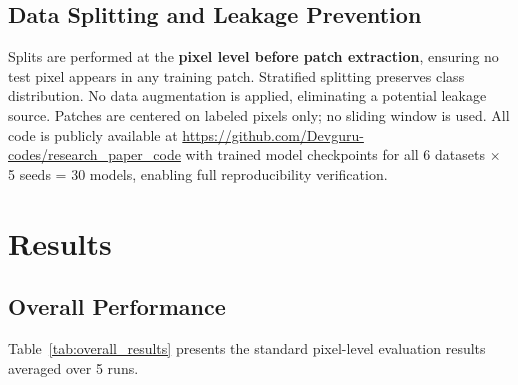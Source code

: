 \documentclass[pdflatex,sn-mathphys-num]{sn-jnl}
\theoremstyle{thmstyleone}
\theoremstyle{thmstyletwo}
\theoremstyle{thmstylethree}
\begin{document}
\subsection{Data Splitting and Leakage Prevention}

Splits are performed at the \textbf{pixel level before patch extraction}, ensuring no test pixel appears in any training patch. Stratified splitting preserves class distribution. No data augmentation is applied, eliminating a potential leakage source. Patches are centered on labeled pixels only; no sliding window is used. All code is publicly available at \url{https://github.com/Devguru-codes/research_paper_code} with trained model checkpoints for all 6 datasets $\times$ 5 seeds = 30 models, enabling full reproducibility verification.

\section{Results}

\subsection{Overall Performance}

Table~\ref{tab:overall_results} presents the standard pixel-level evaluation results averaged over 5 runs.
\end{document}
